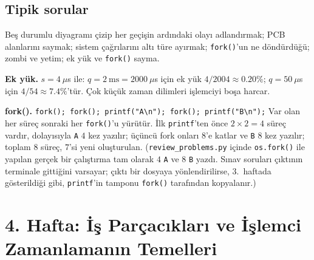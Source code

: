 \documentclass[11pt,a4paper]{article}
\newcommand{\cmd}[1]{\texttt{#1}}
\begin{document}
\subsection*{Tipik sorular}
Beş durumlu diyagramı çizip her geçişin ardındaki olayı adlandırmak; PCB alanlarını saymak; sistem çağrılarını altı türe ayırmak; \cmd{fork()}'un ne döndürdüğü; zombi ve yetim; ek yük ve \cmd{fork()} sayma.

\begin{example}
\textbf{Ek yük.} $s = 4\ \mu$s ile: $q = 2\ \text{ms} = 2000\ \mu$s için ek yük $4/2004 \approx 0.20\%$; $q = 50\ \mu$s için $4/54 \approx 7.4\%$'tür. Çok küçük zaman dilimleri işlemciyi boşa harcar.

\textbf{fork().} \cmd{fork(); fork(); printf("A\textbackslash n"); fork(); printf("B\textbackslash n");} Var olan her süreç sonraki her \cmd{fork()}'u yürütür. İlk \cmd{printf}'ten önce $2 \times 2 = 4$ süreç vardır, dolayısıyla \texttt{A} $4$ kez yazılır; üçüncü fork onları $8$'e katlar ve \texttt{B} $8$ kez yazılır; toplam $8$ süreç, $7$'si yeni oluşturulan. (\texttt{review\_problems.py} içinde \cmd{os.fork()} ile yapılan gerçek bir çalıştırma tam olarak $4$ \texttt{A} ve $8$ \texttt{B} yazdı. Sınav soruları çıktının terminale gittiğini varsayar; çıktı bir dosyaya yönlendirilirse, 3.~haftada gösterildiği gibi, \cmd{printf}'in tamponu \cmd{fork()} tarafından kopyalanır.)
\end{example}

\section{4. Hafta: İş Parçacıkları ve İşlemci Zamanlamanın Temelleri}
\label{sec:w4}
\end{document}
